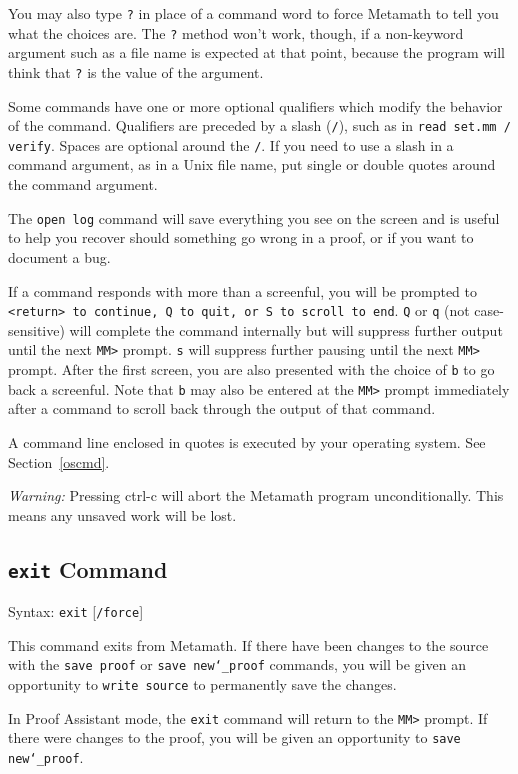 You may also type \texttt{?} in place of a command word to force
Metamath to tell you what the choices are.  The \texttt{?} method won't
work, though, if a non-keyword argument such as a file name is expected
at that point, because the program will think that \texttt{?} is the
value of the argument.

Some commands have one or more optional qualifiers which modify the
behavior of the command.  Qualifiers are preceded by a slash
(\texttt{/}), such as in \texttt{read set.mm / verify}.  Spaces are
optional around the \texttt{/}.  If you need to use a slash in a command
argument, as in a Unix file name, put single or double quotes around the
command argument.

The \texttt{open log} command will save everything you see on the
screen and is useful to help you recover should something go wrong in a
proof, or if you want to document a bug.

If a command responds with more than a screenful, you will be
prompted to \texttt{<return> to continue, Q to quit, or S to scroll to
end}.  \texttt{Q} or \texttt{q} (not case-sensitive) will complete the
command internally but will suppress further output until the next
\texttt{MM>} prompt.  \texttt{s} will suppress further pausing until the
next \texttt{MM>} prompt.  After the first screen, you are also
presented with the choice of \texttt{b} to go back a screenful.  Note
that \texttt{b} may also be entered at the \texttt{MM>} prompt
immediately after a command to scroll back through the output of that
command.

A command line enclosed in quotes is executed by your operating system.
See Section~\ref{oscmd}.

{\em Warning:} Pressing {\sc ctrl-c} will abort the Metamath program
unconditionally.  This means any unsaved work will be lost.


\subsection{\texttt{exit} Command}

Syntax:  \texttt{exit} [\texttt{/force}]

This command exits from Metamath.  If there have been changes to the
source with the \texttt{save proof} or \texttt{save new{\char`\_}proof}
commands, you will be given an opportunity to \texttt{write source} to
permanently save the changes.

In Proof Assistant mode, the \texttt{exit} command will
return to the \verb/MM>/ prompt. If there were changes to the proof, you will
be given an opportunity to \texttt{save new{\char`\_}proof}.

